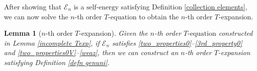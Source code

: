 \documentclass{article}
\newcommand{\1}{\mathds{1}}
\numberwithin{equation}{section}
\newcommand{\fb}{{\mathfrak b}}
\newcommand{\self}{\text{self-energy}}
\theoremstyle{plain} %
\newtheorem{lemma}[theorem]{Lemma}
\theoremstyle{remark}
\newcommand{\Sele}{{\mathcal E}}
\newcommand{\incomp}{{\text{$T$-equation}}}
\begin{document}
After showing that $ \Sele_{n} $ is a $\self$ satisfying Definition \ref{collection elements}, we can now %
solve the $n$-th order $\incomp$ to obtain the $n$-th order $T$-expansion.

 \begin{lemma}[$n$-th order $T$-expansion]   \label{lem completeTexp} 
 Given the $n$-th order $\incomp$ constructed in Lemma \ref{incomplete Texp}, if $\Sele_n $ satisfies \eqref{two_properties0}--\eqref{3rd_property0} and \eqref{two_properties0V}--\eqref{weaz}, then we can construct an $n$-th order $T$-expansion satisfying Definition \ref{defn genuni}.
\end{lemma}
\end{document}
